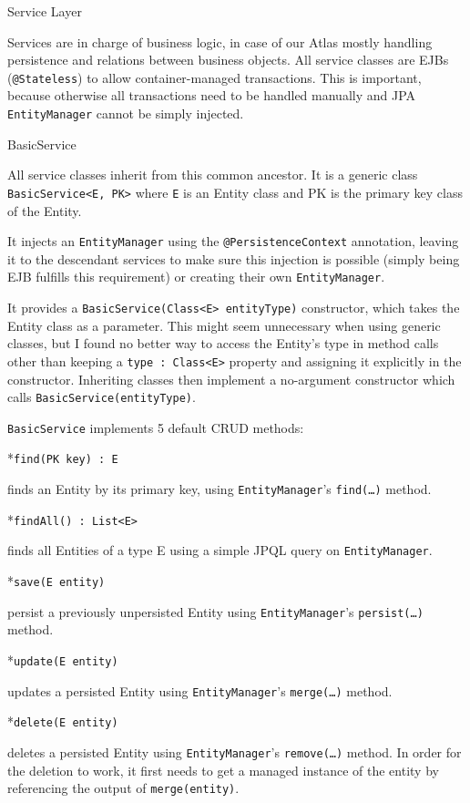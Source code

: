 \sec Service Layer

Services are in charge of business logic, in case of our Atlas mostly handling persistence and relations between business objects. All service classes are EJBs ({\tt @Stateless}) to allow container-managed transactions. This is important, because otherwise all transactions need to be handled manually and JPA {\tt EntityManager} cannot be simply injected.

\secc BasicService

All service classes inherit from this common ancestor. It is a generic class {\tt BasicService<E, PK>} where {\tt E} is an Entity class and PK is the primary key class of the Entity.

It injects an {\tt EntityManager} using the {\tt @PersistenceContext} annotation, leaving it to the descendant services to make sure this injection is possible (simply being EJB fulfills this requirement) or creating their own {\tt EntityManager}.

It provides a {\tt BasicService(Class<E> entityType)} constructor, which takes the Entity class as a parameter. This might seem unnecessary when using generic classes, but I found no better way to access the Entity’s type in method calls other than keeping a {\tt type : Class<E>} property and assigning it explicitly in the constructor. Inheriting classes then implement a no-argument constructor which calls {\tt BasicService(entityType)}.

{\tt BasicService} implements 5 default CRUD methods:

\begitems

*{\tt find(PK key) : E}

finds an Entity by its primary key, using {\tt EntityManager}’s {\tt find(…)} method.

*{\tt findAll() : List<E>}

finds all Entities of a type {E} using a simple JPQL query on {\tt EntityManager}.

*{\tt save(E entity)}

persist a previously unpersisted Entity using {\tt EntityManager}’s {\tt persist(…)} method.

*{\tt update(E entity)}

updates a persisted Entity using {\tt EntityManager}’s {\tt merge(…)} method.

*{\tt delete(E entity)}

deletes a persisted Entity using {\tt EntityManager}’s {\tt remove(…)} method. In order for the deletion to work, it first needs to get a managed instance of the entity by referencing the output of {\tt merge(entity)}.

